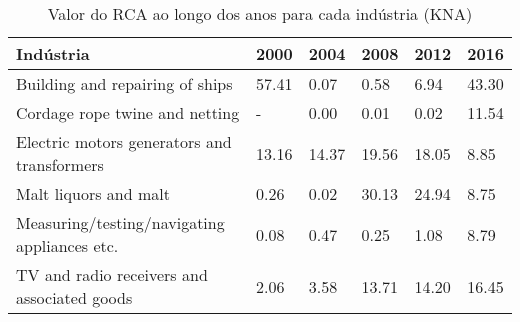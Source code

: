 \begin{table}
\centering
\caption{Valor do RCA ao longo dos anos para cada indústria (KNA)}
\begin{tabular}{p{6cm}p{1.5cm}p{1.5cm}p{1.5cm}p{1.5cm}p{1.5cm}}
\toprule
                                   Indústria &  2000 &  2004 &  2008 &  2012 &  2016 \\
\midrule
             Building and repairing of ships & 57.41 &  0.07 &  0.58 &  6.94 & 43.30 \\
              Cordage rope twine and netting &     - &  0.00 &  0.01 &  0.02 & 11.54 \\
 Electric motors generators and transformers & 13.16 & 14.37 & 19.56 & 18.05 &  8.85 \\
                       Malt liquors and malt &  0.26 &  0.02 & 30.13 & 24.94 &  8.75 \\
Measuring/testing/navigating appliances etc. &  0.08 &  0.47 &  0.25 &  1.08 &  8.79 \\
 TV and radio receivers and associated goods &  2.06 &  3.58 & 13.71 & 14.20 & 16.45 \\
\bottomrule
\end{tabular}
\end{table}
